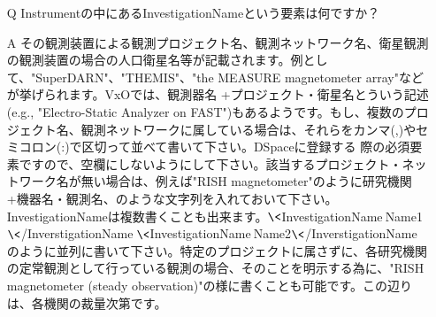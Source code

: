 \begin{screen}
\begin{itemize}
\item[\stepcounter{qq}Q\theqq] Instrumentの中にあるInvestigationNameという要素は何ですか？
\item[\stepcounter{aa}A\theaa] その観測装置による観測プロジェクト名、観測ネットワーク名、衛星観測の観測装置の場合の人口衛星名等が記載されます。例として、"SuperDARN"、"THEMIS"、"the MEASURE magnetometer array"などが挙げられます。VxOでは、観測器名
+プロジェクト・衛星名とういう記述(e.g., "Electro-Static Analyzer on FAST")もあるようです。もし、複数のプロジェクト名、観測ネットワークに属している場合は、それらをカンマ(,)やセミコロン(:)で区切って並べて書いて下さい。DSpaceに登録する
際の必須要素ですので、空欄にしないようにして下さい。該当するプロジェクト・ネットワーク名が無い場合は、例えば"RISH magnetometer"のように研究機関+機器名・観測名、のような文字列を入れておいて下さい。InvestigationNameは複数書くことも出来ます。{\scriptsize $\<$InvestigationName$\>$Name1$\<$/InverstigationName$\>$$\<$InvestigationName$\>$Name2$\<$/InverstigationName$\>$}のように並列に書いて下さい。特定のプロジェクトに属さずに、各研究機関の定常観測として行っている観測の場合、そのことを明示する為に、"RISH magnetometer (steady observation)"の様に書くことも可能です。この辺りは、各機関の裁量次第です。
\end{itemize}
\end{screen}